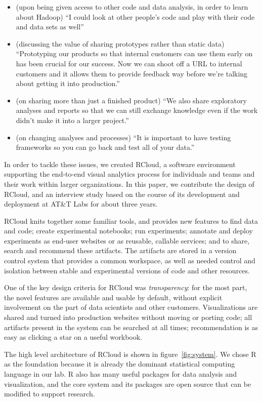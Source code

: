 \begin{itemize}
\item (upon being given access to other code and data analysis, in
order to learn about Hadoop) ``I could look at other people’s code
and play with their code and data sets as well''
\item (discussing the value of sharing prototypes rather than static
data) ``Prototyping our products so that internal
customers can use them early on has been crucial for
our success. Now we can shoot off a URL to internal
customers and it allows them to provide feedback way before
we're talking about getting it into production.''
\item (on sharing more than just a finished product) ``We also share
exploratory analyses and reports so that we can still exchange
knowledge even if the work didn't make it into a larger project.''
\item (on changing analyses and processes) ``It is important to
have testing frameworks so you can go back and test all
of your data.''
\end{itemize}

In order to tackle these issues, we created RCloud, a software environment
supporting the end-to-end visual analytics process for individuals and
teams and their work within larger organizations. In this paper, we
contribute the design of RCloud, and an interview study based on the
course of its development and deployment at AT\&T Labs for about three
years.

RCloud knits together some familiar tools, and 
provides new features to find data and code; create experimental notebooks;
run experiments; annotate and deploy experiments as end-user websites or
as reusable, callable services; and to share, search and recommend these artifacts.
The artifacts are stored in a version
control system that provides a common workspace, as well as needed control
and isolation between stable and experimental versions of code and other
resources. 

One of the key design criteria for RCloud was \emph{transparency}: for
the most part, the novel features are
available and usable by default, without explicit involvement on the part of
data scientists and other customers. Visualizations are
shared and turned into production websites without moving
or porting code; all artifacts present in the system can be
searched at all times; recommendation is as easy as clicking a star
on a useful workbook.

The high level architecture of RCloud
is shown in figure~\ref{fig:system}.
We chose R as the foundation because it is already
the dominant statistical computing language in our lab.
R also has many useful packages for data analysis and visualization,
and the core system and its packages are open source that can be modified to
support research. 

